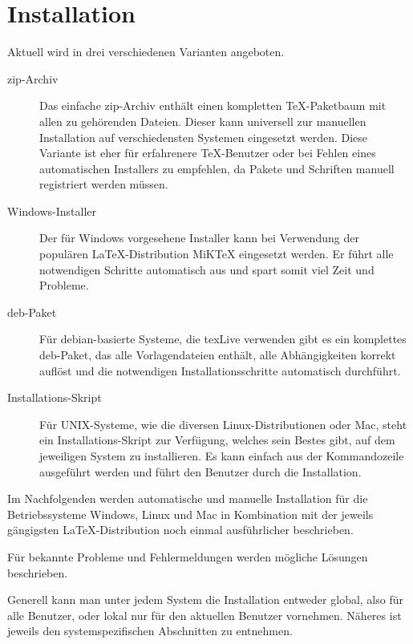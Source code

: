 \chapter{Installation}\label{sec:install}

Aktuell wird \tubslatex in drei verschiedenen Varianten angeboten.

\begin{description}
  \item[zip-Archiv]
    Das einfache zip-Archiv enthält einen kompletten \TeX-Paketbaum mit
    allen zu \tubslatex gehörenden Dateien.
    Dieser kann universell zur manuellen Installation auf verschiedensten
    Systemen eingesetzt werden.
    Diese Variante ist eher für erfahrenere \TeX-Benutzer oder bei
    Fehlen eines automatischen Installers zu empfehlen, da Pakete
    und Schriften manuell registriert werden müssen.
  \item[Windows-Installer]
    Der für Windows vorgesehene Installer kann bei Verwendung der
    populären \LaTeX-Distribution MiKTeX eingesetzt werden.
    Er führt alle notwendigen Schritte automatisch aus und spart somit
    viel Zeit und Probleme.
  \item[deb-Paket]
    Für debian-basierte Systeme, die texLive verwenden gibt es
    ein komplettes deb-Paket, das alle Vorlagendateien enthält,
    alle Abhängigkeiten korrekt auflöst und die notwendigen
    Installationsschritte automatisch durchführt.
  \item[Installations-Skript]
    Für UNIX-Systeme, wie die diversen Linux-Distributionen oder Mac,
    steht ein Installations-Skript zur Verfügung, welches sein Bestes
    gibt, \tubslatex auf dem jeweiligen System zu installieren.
    Es kann einfach aus der Kommandozeile ausgeführt werden und führt den Benutzer
    durch die Installation.
\end{description}

Im Nachfolgenden werden automatische und manuelle Installation für
die Betriebssysteme Windows, Linux und Mac in Kombination mit der
jeweils gängigsten \LaTeX-Distribution noch einmal ausführlicher
beschrieben.

Für bekannte Probleme und Fehlermeldungen werden mögliche Lösungen beschrieben.

Generell kann man unter jedem System die Installation entweder global, 
also für alle Benutzer, oder lokal nur für den aktuellen Benutzer vornehmen.
Näheres ist jeweils den systemspezifischen Abschnitten zu entnehmen.


